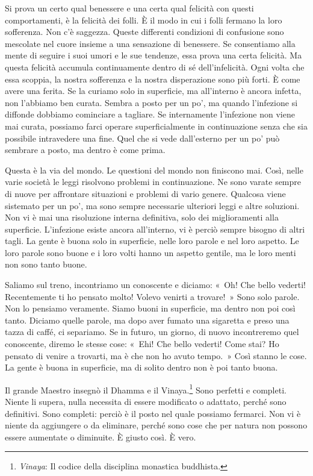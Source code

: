 Si prova un certo qual benessere e una certa qual felicità con questi
comportamenti, è la felicità dei folli. È il modo in cui i folli fermano
la loro sofferenza. Non c'è saggezza. Queste differenti condizioni di
confusione sono mescolate nel cuore insieme a una sensazione di
benessere. Se consentiamo alla mente di seguire i suoi umori e le sue
tendenze, essa prova una certa felicità. Ma questa felicità accumula
continuamente dentro di sé dell'infelicità. Ogni volta che essa scoppia,
la nostra sofferenza e la nostra disperazione sono più forti. È come
avere una ferita. Se la curiamo solo in superficie, ma all'interno è
ancora infetta, non l'abbiamo ben curata. Sembra a posto per un po', ma
quando l'infezione si diffonde dobbiamo cominciare a tagliare. Se
internamente l'infezione non viene mai curata, possiamo farci operare
superficialmente in continuazione senza che sia possibile intravedere
una fine. Quel che si vede dall'esterno per un po' può sembrare a posto,
ma dentro è come prima.

Questa è la via del mondo. Le questioni del mondo non finiscono mai.
Così, nelle varie società le leggi risolvono problemi in continuazione.
Ne sono varate sempre di nuove per affrontare situazioni e problemi di
vario genere. Qualcosa viene sistemato per un po', ma sono sempre
necessarie ulteriori leggi e altre soluzioni. Non vi è mai una
risoluzione interna definitiva, solo dei miglioramenti alla superficie.
L'infezione esiste ancora all'interno, vi è perciò sempre bisogno di
altri tagli. La gente è buona solo in superficie, nelle loro parole e
nel loro aspetto. Le loro parole sono buone e i loro volti hanno un
aspetto gentile, ma le loro menti non sono tanto buone.

Saliamo sul treno, incontriamo un conoscente e diciamo: «~Oh! Che bello
vederti! Recentemente ti ho pensato molto! Volevo venirti a trovare!~»
Sono solo parole. Non lo pensiamo veramente. Siamo buoni in superficie,
ma dentro non poi così tanto. Diciamo quelle parole, ma dopo aver fumato
una sigaretta e preso una tazza di caffé, ci separiamo. Se in futuro, un
giorno, di nuovo incontreremo quel conoscente, diremo le stesse cose:
«~Ehi! Che bello vederti! Come stai? Ho pensato di venire a trovarti, ma
è che non ho avuto tempo.~» Così stanno le cose. La gente è buona in
superficie, ma di solito dentro non è poi tanto buona.

Il grande Maestro insegnò il Dhamma e il Vinaya.\footnote{%
  \emph{Vinaya}: Il codice della disciplina monastica buddhista.}
Sono perfetti e
completi. Niente li supera, nulla necessita di essere modificato o
adattato, perché sono definitivi. Sono completi: perciò è il posto nel
quale possiamo fermarci. Non vi è niente da aggiungere o da eliminare,
perché sono cose che per natura non possono essere aumentate o
diminuite. È giusto così. È vero.

